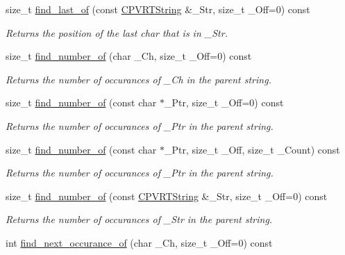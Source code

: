 \begin{DoxyCompactItemize}
size\+\_\+t \hyperlink{class_c_p_v_r_t_string_a66e86eaf153fe0677235e24ac9d3cd9d}{find\+\_\+last\+\_\+of} (const \hyperlink{class_c_p_v_r_t_string}{C\+P\+V\+R\+T\+String} \&\+\_\+\+Str, size\+\_\+t \+\_\+\+Off=0) const 
\begin{DoxyCompactList}\small\item\em Returns the position of the last char that is in \+\_\+\+Str. \end{DoxyCompactList}\item 
size\+\_\+t \hyperlink{class_c_p_v_r_t_string_aedbcf94a3d39dbee321576aff1c29762}{find\+\_\+number\+\_\+of} (char \+\_\+\+Ch, size\+\_\+t \+\_\+\+Off=0) const 
\begin{DoxyCompactList}\small\item\em Returns the number of occurances of \+\_\+\+Ch in the parent string. \end{DoxyCompactList}\item 
size\+\_\+t \hyperlink{class_c_p_v_r_t_string_a07e5836dbfaffb1eae775cc36e10564b}{find\+\_\+number\+\_\+of} (const char $\ast$\+\_\+\+Ptr, size\+\_\+t \+\_\+\+Off=0) const 
\begin{DoxyCompactList}\small\item\em Returns the number of occurances of \+\_\+\+Ptr in the parent string. \end{DoxyCompactList}\item 
size\+\_\+t \hyperlink{class_c_p_v_r_t_string_a16ccd07e094154b4f6581672ebd930c3}{find\+\_\+number\+\_\+of} (const char $\ast$\+\_\+\+Ptr, size\+\_\+t \+\_\+\+Off, size\+\_\+t \+\_\+\+Count) const 
\begin{DoxyCompactList}\small\item\em Returns the number of occurances of \+\_\+\+Ptr in the parent string. \end{DoxyCompactList}\item 
size\+\_\+t \hyperlink{class_c_p_v_r_t_string_a1cd6a624ef671f897d6ee64b6bd7cae9}{find\+\_\+number\+\_\+of} (const \hyperlink{class_c_p_v_r_t_string}{C\+P\+V\+R\+T\+String} \&\+\_\+\+Str, size\+\_\+t \+\_\+\+Off=0) const 
\begin{DoxyCompactList}\small\item\em Returns the number of occurances of \+\_\+\+Str in the parent string. \end{DoxyCompactList}\item 
int \hyperlink{class_c_p_v_r_t_string_ae14a156ba0a9dc525d279acdacc92239}{find\+\_\+next\+\_\+occurance\+\_\+of} (char \+\_\+\+Ch, size\+\_\+t \+\_\+\+Off=0) const 

\end{DoxyCompactItemize}
